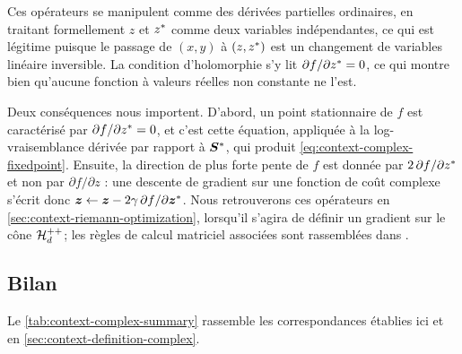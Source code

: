 \begin{remark}
  Ces opérateurs se manipulent comme des dérivées partielles ordinaires, en traitant formellement $z$ et ${z}^{*}$ comme deux variables indépendantes, ce qui est légitime puisque le passage de $(x,y)$ à $(z,{z}^{*})$ est un changement de variables linéaire inversible. La condition d'holomorphie s'y lit $\partial f/\partial{z}^{*} = 0$, ce qui montre bien qu'aucune fonction à valeurs réelles non constante ne l'est.

  Deux conséquences nous importent. D'abord, un point stationnaire de $f$ est caractérisé par $\partial f/\partial{z}^{*} = 0$, et c'est cette équation, appliquée à la log-vraisemblance dérivée par rapport à ${\boldsymbol{S}}^{*}$, qui produit \cref{eq:context-complex-fixedpoint}. Ensuite, la direction de plus forte pente de $f$ est donnée par $2\,\partial f/\partial{z}^{*}$ et non par $\partial f/\partial z$ : une descente de gradient sur une fonction de coût complexe s'écrit donc $\boldsymbol{z}\leftarrow\boldsymbol{z} - 2\gamma\,\partial f/\partial{\boldsymbol{z}}^{*}$. Nous retrouverons ces opérateurs en \cref{sec:context-riemann-optimization}, lorsqu'il s'agira de définir un gradient sur le cône $\mathcal{H}_{d}^{++}$; les règles de calcul matriciel associées sont rassemblées dans \cite{Hjorungnes2011}.
\end{remark}

\subsection{Bilan}

Le \cref{tab:context-complex-summary} rassemble les correspondances établies ici et en \cref{sec:context-definition-complex}.

